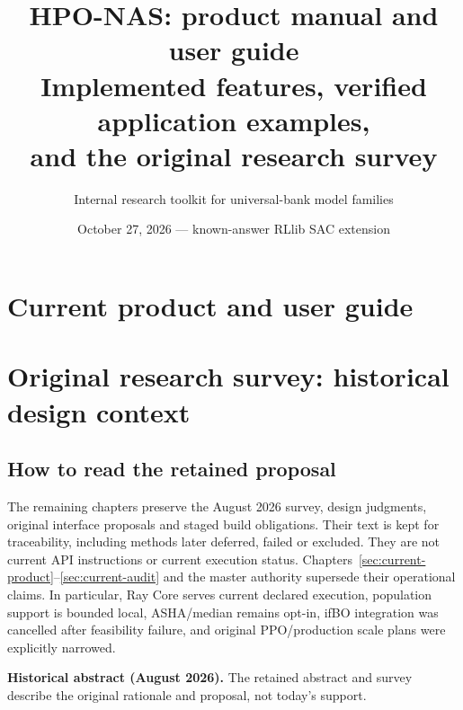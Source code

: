 \documentclass[11pt]{report}
\title{HPO-NAS: product manual and user guide\\
Implemented features, verified application examples,\\
and the original research survey}
\author{Internal research toolkit for universal-bank model families}
\date{October 27, 2026 --- known-answer RLlib SAC extension}
\newenvironment{decisions}{%
  \def\FrameCommand{{\color{blue!50!black}\vrule width 2.5pt}\hspace{8pt}}%
  \MakeFramed{\advance\hsize-\width\FrameRestore}\small}%
{\endMakeFramed}
\begin{document}
\maketitle

\begin{abstract}

\end{abstract}

\setcounter{tocdepth}{1}
\tableofcontents
\clearpage

\part{Current product and user guide}










\clearpage
\sloppy
\addtolength{\textheight}{5pt}
\part{Original research survey: historical design context}
\chapter*{How to read the retained proposal}
The remaining chapters preserve the August 2026 survey, design judgments,
original interface proposals and staged build obligations. Their text is kept
for traceability, including methods later deferred, failed or excluded.
They are not current API instructions or current execution status.
Chapters~\ref{sec:current-product}--\ref{sec:current-audit} and the master
authority supersede their operational claims. In particular, Ray Core serves
current declared execution, population support is bounded local, ASHA/median
remains opt-in, ifBO integration was cancelled after feasibility failure, and
original PPO/production scale plans were explicitly narrowed.

\begin{decisions}
\textbf{Historical abstract (August 2026).} The retained abstract and survey
describe the original rationale and proposal, not today's support.
\end{decisions}

\clearpage


\end{document}
